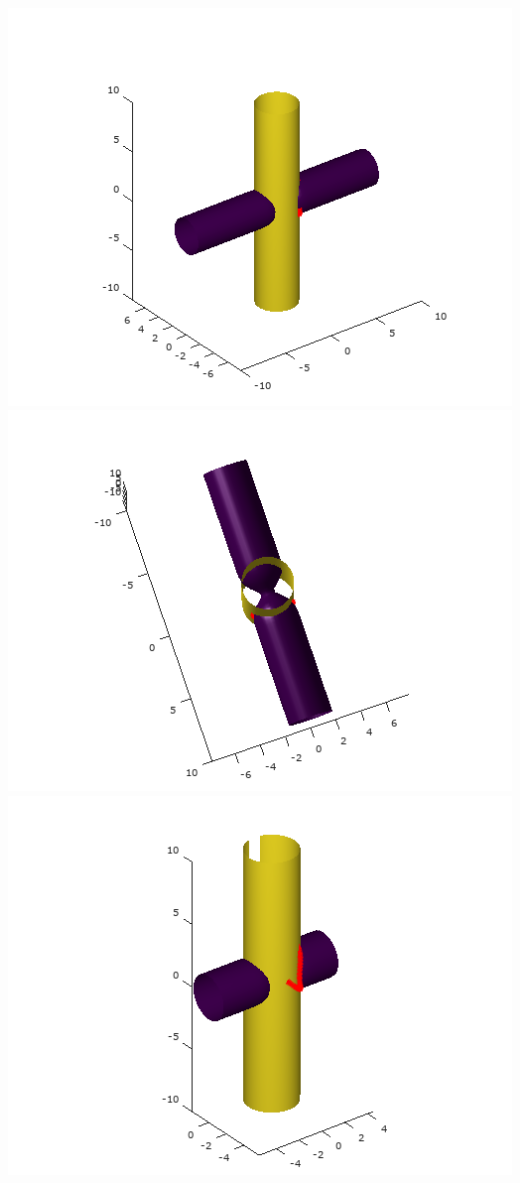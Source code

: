 \documentclass[]{article}
\begin{document}
	\includegraphics[scale=0.3]{primer7_1}
	\includegraphics[scale=0.3]{primer7_2}\\
	\includegraphics[scale=0.3]{primer7_3}
\end{document}
